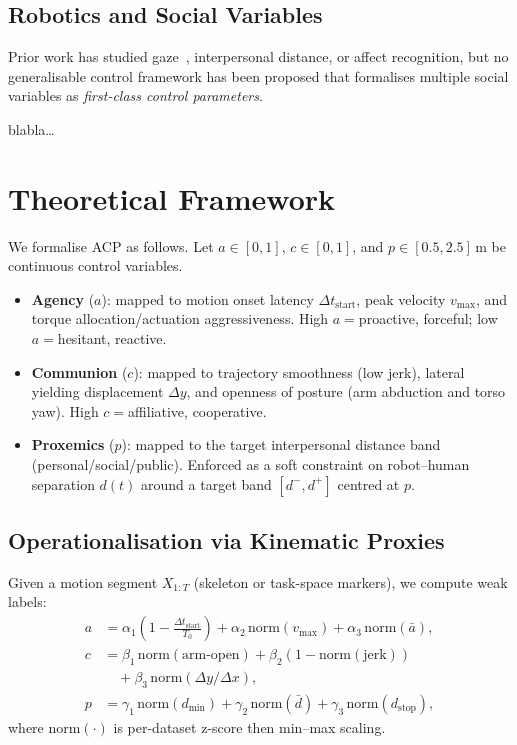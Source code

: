 \documentclass[journal]{IEEEtran}
\begin{document}
\subsection{Robotics and Social Variables}
Prior work has studied gaze~\cite{belkaid2021gaze}, interpersonal distance, or affect recognition, but no generalisable control framework has been proposed that formalises multiple social variables as \emph{first-class control parameters}.

blabla\dots

\section{Theoretical Framework}\label{sec:framework}
We formalise ACP as follows. Let $a \in [0,1]$, $c \in [0,1]$, and $p \in [0.5, 2.5]\,\mathrm{m}$ be continuous control variables.

\begin{itemize}
\item \textbf{Agency} ($a$): mapped to motion onset latency $\Delta t_{\text{start}}$, peak velocity $v_{\max}$, and torque allocation/actuation aggressiveness. High $a=$proactive, forceful; low $a=$hesitant, reactive.
\item \textbf{Communion} ($c$): mapped to trajectory smoothness (low jerk), lateral yielding displacement $\Delta y$, and openness of posture (arm abduction and torso yaw). High $c=$affiliative, cooperative.
\item \textbf{Proxemics} ($p$): mapped to the target interpersonal distance band (personal/social/public). Enforced as a soft constraint on robot--human separation $d(t)$ around a target band $[d^{-}, d^{+}]$ centred at $p$.
\end{itemize}

\subsection{Operationalisation via Kinematic Proxies}
Given a motion segment $X_{1:T}$ (skeleton or task-space markers), we compute weak labels:
\begin{align}
a &= \alpha_1 \left(1 - \tfrac{\Delta t_{\text{start}}}{T_0}\right)
      + \alpha_2 \,\mathrm{norm}(v_{\max})
      + \alpha_3 \,\mathrm{norm}(\bar{a}), \label{eq:a-proxy} \\
c &= \beta_1 \,\mathrm{norm}(\text{arm-open})
      + \beta_2 \left(1 - \mathrm{norm}(\text{jerk})\right) \nonumber \\
  &\quad + \beta_3 \,\mathrm{norm}(\Delta y / \Delta x), \label{eq:c-proxy} \\
p &= \gamma_1 \,\mathrm{norm}(d_{\min})
      + \gamma_2 \,\mathrm{norm}(\bar{d})
      + \gamma_3 \,\mathrm{norm}(d_{\text{stop}}), \label{eq:p-proxy}
\end{align}
where $\mathrm{norm}(\cdot)$ is per-dataset z-score then min--max scaling.
\end{document}
